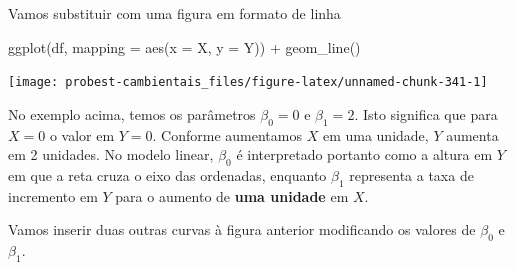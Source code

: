 \documentclass[
]{book}
\newenvironment{Shaded}{\begin{snugshade}}{\end{snugshade}}
\newcommand{\AttributeTok}[1]{\textcolor[rgb]{0.77,0.63,0.00}{#1}}
\newcommand{\FunctionTok}[1]{\textcolor[rgb]{0.00,0.00,0.00}{#1}}
\newcommand{\NormalTok}[1]{#1}
\newcommand{\SpecialCharTok}[1]{\textcolor[rgb]{0.00,0.00,0.00}{#1}}
\begin{document}
Vamos substituir com uma figura em formato de linha

\begin{Shaded}
\begin{Highlighting}[]
\FunctionTok{ggplot}\NormalTok{(df, }\AttributeTok{mapping =} \FunctionTok{aes}\NormalTok{(}\AttributeTok{x =}\NormalTok{ X, }\AttributeTok{y =}\NormalTok{ Y)) }\SpecialCharTok{+}
  \FunctionTok{geom\_line}\NormalTok{()}
\end{Highlighting}
\end{Shaded}

\begin{center}\texttt{[image: probest-cambientais\_files/figure-latex/unnamed-chunk-341-1]} \end{center}

No exemplo acima, temos os parâmetros \(\beta_0 = 0\) e \(\beta_1 = 2\). Isto significa que para \(X = 0\) o valor em \(Y = 0\). Conforme aumentamos \(X\) em uma unidade, \(Y\) aumenta em 2 unidades. No modelo linear, \(\beta_0\) é interpretado portanto como a altura em \(Y\) em que a reta cruza o eixo das ordenadas, enquanto \(\beta_1\) representa a taxa de incremento em \(Y\) para o aumento de \textbf{uma unidade} em \(X\).

Vamos inserir duas outras curvas à figura anterior modificando os valores de \(\beta_0\) e \(\beta_1\).
\end{document}
